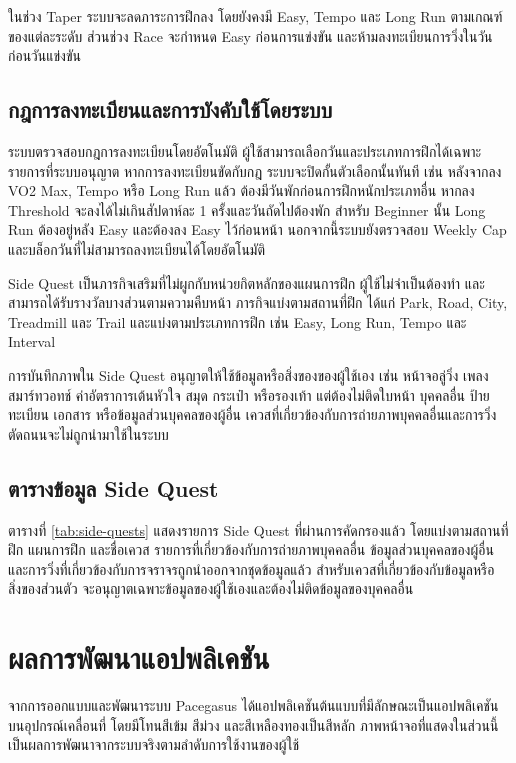 ในช่วง Taper ระบบจะลดภาระการฝึกลง โดยยังคงมี Easy, Tempo และ Long Run ตามเกณฑ์ของแต่ละระดับ ส่วนช่วง Race จะกำหนด Easy ก่อนการแข่งขัน และห้ามลงทะเบียนการวิ่งในวันก่อนวันแข่งขัน

\subsection{กฎการลงทะเบียนและการบังคับใช้โดยระบบ}

ระบบตรวจสอบกฎการลงทะเบียนโดยอัตโนมัติ ผู้ใช้สามารถเลือกวันและประเภทการฝึกได้เฉพาะรายการที่ระบบอนุญาต หากการลงทะเบียนขัดกับกฎ ระบบจะปิดกั้นตัวเลือกนั้นทันที เช่น หลังจากลง VO2 Max, Tempo หรือ Long Run แล้ว ต้องมีวันพักก่อนการฝึกหนักประเภทอื่น หากลง Threshold จะลงได้ไม่เกินสัปดาห์ละ 1 ครั้งและวันถัดไปต้องพัก สำหรับ Beginner นั้น Long Run ต้องอยู่หลัง Easy และต้องลง Easy ไว้ก่อนหน้า นอกจากนี้ระบบยังตรวจสอบ Weekly Cap และบล็อกวันที่ไม่สามารถลงทะเบียนได้โดยอัตโนมัติ

Side Quest เป็นภารกิจเสริมที่ไม่ผูกกับหน่วยกิตหลักของแผนการฝึก ผู้ใช้ไม่จำเป็นต้องทำ และสามารถได้รับรางวัลบางส่วนตามความคืบหน้า ภารกิจแบ่งตามสถานที่ฝึก ได้แก่ Park, Road, City, Treadmill และ Trail และแบ่งตามประเภทการฝึก เช่น Easy, Long Run, Tempo และ Interval

การบันทึกภาพใน Side Quest อนุญาตให้ใช้ข้อมูลหรือสิ่งของของผู้ใช้เอง เช่น หน้าจอลู่วิ่ง เพลง สมาร์ทวอทช์ ค่าอัตราการเต้นหัวใจ สมุด กระเป๋า หรือรองเท้า แต่ต้องไม่ติดใบหน้า บุคคลอื่น ป้ายทะเบียน เอกสาร หรือข้อมูลส่วนบุคคลของผู้อื่น เควสที่เกี่ยวข้องกับการถ่ายภาพบุคคลอื่นและการวิ่งตัดถนนจะไม่ถูกนำมาใช้ในระบบ

\subsection{ตารางข้อมูล Side Quest}

ตารางที่ \ref{tab:side-quests} แสดงรายการ Side Quest ที่ผ่านการคัดกรองแล้ว โดยแบ่งตามสถานที่ฝึก แผนการฝึก และชื่อเควส รายการที่เกี่ยวข้องกับการถ่ายภาพบุคคลอื่น ข้อมูลส่วนบุคคลของผู้อื่น และการวิ่งที่เกี่ยวข้องกับการจราจรถูกนำออกจากชุดข้อมูลแล้ว สำหรับเควสที่เกี่ยวข้องกับข้อมูลหรือสิ่งของส่วนตัว จะอนุญาตเฉพาะข้อมูลของผู้ใช้เองและต้องไม่ติดข้อมูลของบุคคลอื่น


\normalsize

\section{ผลการพัฒนาแอปพลิเคชัน}

จากการออกแบบและพัฒนาระบบ Pacegasus ได้แอปพลิเคชันต้นแบบที่มีลักษณะเป็นแอปพลิเคชันบนอุปกรณ์เคลื่อนที่ โดยมีโทนสีเข้ม สีม่วง และสีเหลืองทองเป็นสีหลัก ภาพหน้าจอที่แสดงในส่วนนี้เป็นผลการพัฒนาจากระบบจริงตามลำดับการใช้งานของผู้ใช้


